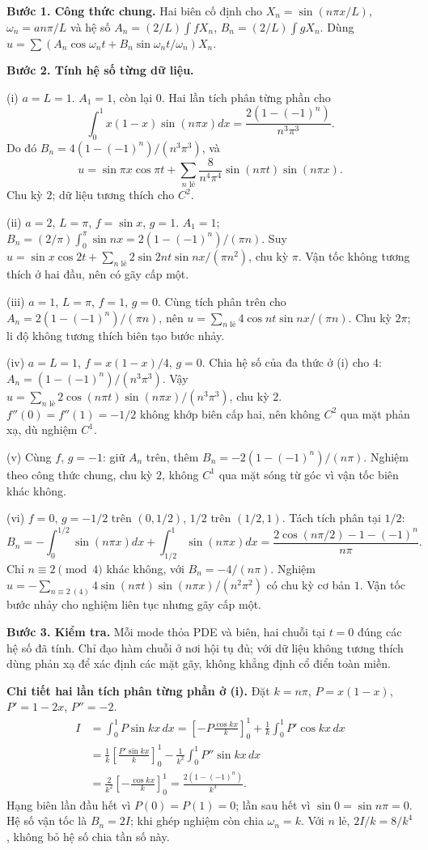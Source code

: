 \textbf{Bước 1. Công thức chung.} Hai biên cố định cho $X_n=\sin(n\pi x/L)$, $\omega_n=an\pi/L$ và hệ số $A_n=(2/L)\int fX_n$, $B_n=(2/L)\int gX_n$. Dùng $u=\sum(A_n\cos\omega_nt+B_n\sin\omega_nt/\omega_n)X_n$.

\textbf{Bước 2. Tính hệ số từng dữ liệu.}

(i) $a=L=1$. $A_1=1$, còn lại $0$. Hai lần tích phân từng phần cho
\[\int_0^1x(1-x)\sin(n\pi x)dx=\frac{2(1-(-1)^n)}{n^3\pi^3}.\]
Do đó $B_n=4(1-(-1)^n)/(n^3\pi^3)$, và
\[u=\sin\pi x\cos\pi t+\sum_{n\text{ lẻ}}\frac8{n^4\pi^4}\sin(n\pi t)\sin(n\pi x).\]
Chu kỳ $2$; dữ liệu tương thích cho $C^2$.

(ii) $a=2$, $L=\pi$, $f=\sin x$, $g=1$. $A_1=1$; $B_n=(2/\pi)\int_0^\pi\sin nx=2(1-(-1)^n)/(\pi n)$. Suy $u=\sin x\cos2t+\sum_{n\text{ lẻ}}2\sin2nt\sin nx/(\pi n^2)$, chu kỳ $\pi$. Vận tốc không tương thích ở hai đầu, nên có gãy cấp một.

(iii) $a=1$, $L=\pi$, $f=1$, $g=0$. Cùng tích phân trên cho $A_n=2(1-(-1)^n)/(\pi n)$, nên $u=\sum_{n\text{ lẻ}}4\cos nt\sin nx/(\pi n)$. Chu kỳ $2\pi$; li độ không tương thích biên tạo bước nhảy.

(iv) $a=L=1$, $f=x(1-x)/4$, $g=0$. Chia hệ số của đa thức ở (i) cho $4$: $A_n=(1-(-1)^n)/(n^3\pi^3)$. Vậy $u=\sum_{n\text{ lẻ}}2\cos(n\pi t)\sin(n\pi x)/(n^3\pi^3)$, chu kỳ $2$. $f''(0)=f''(1)=-1/2$ không khớp biên cấp hai, nên không $C^2$ qua mặt phản xạ, dù nghiệm $C^1$.

(v) Cùng $f$, $g=-1$: giữ $A_n$ trên, thêm $B_n=-2(1-(-1)^n)/(n\pi)$. Nghiệm theo công thức chung, chu kỳ $2$, không $C^1$ qua mặt sóng từ góc vì vận tốc biên khác không.

(vi) $f=0$, $g=-1/2$ trên $(0,1/2)$, $1/2$ trên $(1/2,1)$. Tách tích phân tại $1/2$:
\[B_n=-\int_0^{1/2}\sin(n\pi x)dx+\int_{1/2}^1\sin(n\pi x)dx
=\frac{2\cos(n\pi/2)-1-(-1)^n}{n\pi}.\]
Chỉ $n\equiv2\pmod4$ khác không, với $B_n=-4/(n\pi)$. Nghiệm $u=-\sum_{n\equiv2\ (4)}4\sin(n\pi t)\sin(n\pi x)/(n^2\pi^2)$ có chu kỳ cơ bản $1$. Vận tốc bước nhảy cho nghiệm liên tục nhưng gãy cấp một.

\textbf{Bước 3. Kiểm tra.} Mỗi mode thỏa PDE và biên, hai chuỗi tại $t=0$ đúng các hệ số đã tính. Chỉ đạo hàm chuỗi ở nơi hội tụ đủ; với dữ liệu không tương thích dùng phản xạ để xác định các mặt gãy, không khẳng định cổ điển toàn miền.

\textbf{Chi tiết hai lần tích phân từng phần ở (i).} Đặt $k=n\pi$, $P=x(1-x)$, $P'=1-2x$, $P''=-2$.
\[\begin{aligned}
I&=\int_0^1P\sin kx\,dx
=\left[-P\frac{\cos kx}{k}\right]_0^1+\frac1k\int_0^1P'\cos kx\,dx\\
&=\frac1k\left[\frac{P'\sin kx}{k}\right]_0^1-\frac1{k^2}\int_0^1P''\sin kx\,dx\\
&=\frac2{k^2}\left[-\frac{\cos kx}{k}\right]_0^1=\frac{2(1-(-1)^n)}{k^3}.
\end{aligned}\]
Hạng biên lần đầu hết vì $P(0)=P(1)=0$; lần sau hết vì $\sin0=\sin n\pi=0$. Hệ số vận tốc là $B_n=2I$; khi ghép nghiệm còn chia $\omega_n=k$. Với $n$ lẻ, $2I/k=8/k^4$, không bỏ hệ số chia tần số này.

